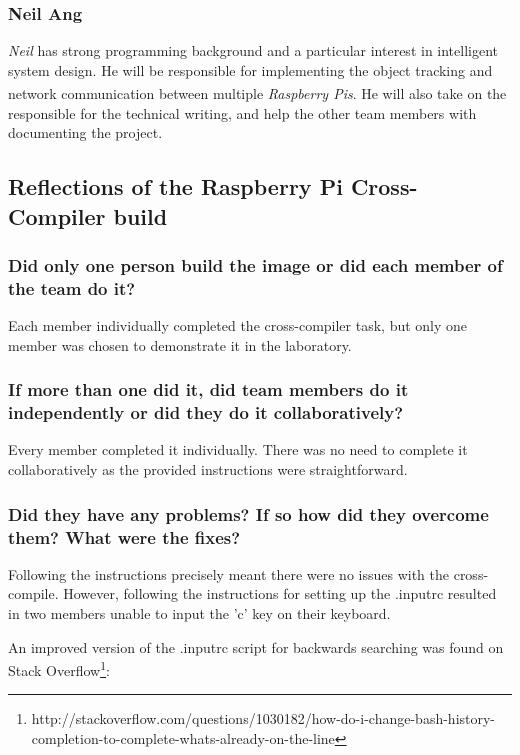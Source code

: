 \documentclass[11pt,a4paper,titlepage]{report}
\newcommand{\rpis}{\textit{Raspberry Pi\textsuperscript{\textregistered}s}}
\begin{document}
\subsection{Neil Ang}
\textit{Neil} has strong programming background and a particular interest in intelligent system design. He will be responsible for implementing the object tracking and network communication between multiple \rpis. He will also take on the responsible for the technical writing, and help the other team members with documenting the project. 


\begin{appendices}
\chapter{Reflections of the Raspberry Pi Cross-Compiler build}

\subsection*{Did only one person build the image or did each member of the team do it?}

Each member individually completed the cross-compiler task, but only one member was chosen to demonstrate it in the laboratory.

\subsection*{If more than one did it, did team members do it independently or did they do it 
collaboratively?}

Every member completed it individually. There was no need to complete it collaboratively as the provided instructions were straightforward.

\subsection*{Did they have any problems? If so how did they overcome them? What were 
the fixes?}

Following the instructions precisely meant there were no issues with the cross-compile. However, following the instructions for setting up the .inputrc resulted in two members unable to input the 'c' key on their keyboard.

An improved version of the .inputrc script for backwards searching was found on Stack Overflow\footnote{http://stackoverflow.com/questions/1030182/how-do-i-change-bash-history-completion-to-complete-whats-already-on-the-line}:


\end{appendices}
\end{document}

